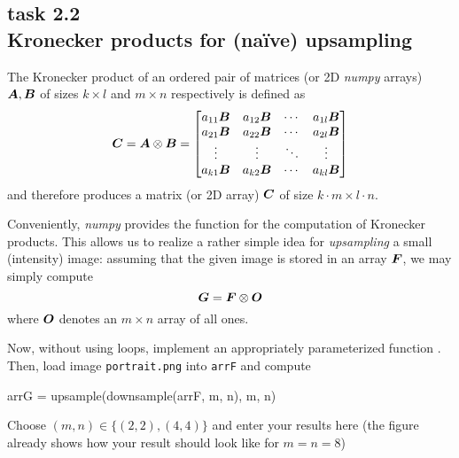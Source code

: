 
\subsection*{task 2.2 \\[1ex] Kronecker products for (na\"ive) upsampling}

The Kronecker product of an ordered pair of matrices (or 2D \emph{numpy} arrays) $\bm{A}, \bm{B}$ of sizes $k \times l $ and $m \times n$ respectively is defined as
\begin{equation*}
\bm{C} = \bm{A} \otimes \bm{B}
=
\begin{bmatrix}
a_{11} \bm{B} & a_{12} \bm{B} & \cdots & a_{1l} \bm{B} \\
a_{21} \bm{B} & a_{22} \bm{B} & \cdots & a_{2l} \bm{B} \\
\vdots & \vdots & \ddots & \vdots \\
a_{k1} \bm{B} & a_{k2} \bm{B} & \cdots & a_{kl} \bm{B} \\
\end{bmatrix}
\end{equation*}
and therefore produces a matrix (or 2D array) $\bm{C}$ of size $k \cdot m \times l \cdot n$.

Conveniently, \emph{numpy} provides the function  for the computation of Kronecker products. This allows us to realize a rather simple idea for \emph{upsampling} a small (intensity) image: assuming that the given image is stored in an array $\bm{F}$, we may simply compute
\begin{equation*}
\bm{G} = \bm{F} \otimes \bm{O}
\end{equation*}
where $\bm{O}$ denotes an $m \times n$ array of all ones.

Now, without using  loops, implement an appropriately parameterized function . Then, load image \texttt{portrait.png} into \texttt{arrF} and compute
\begin{python}[emph={downsample,upsample}]
arrG = upsample(downsample(arrF, m, n), m, n)
\end{python}



\vspace{1cm}
Choose $(m,n) \in \bigl\{ (2,2), (4,4) \bigr\}$ and enter your results here (the figure already shows how your result should look like for $m=n=8$) 
\begin{figure}[h!]
 \hfill
{} \hfill
{} \hfill
{}
\end{figure}






